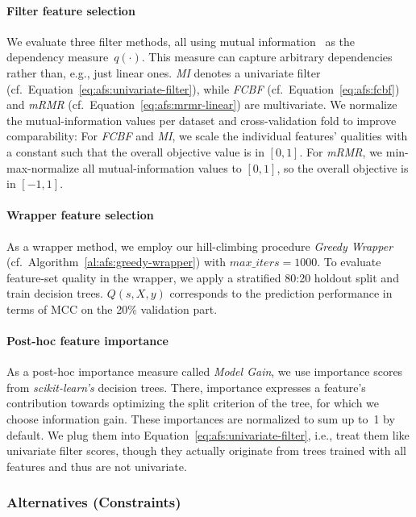 \documentclass{article}
\theoremstyle{definition}
\begin{document}
\paragraph{Filter feature selection}

We evaluate three filter methods, all using mutual information~\cite{kraskov2004estimating} as the dependency measure~$q(\cdot)$.
This measure can capture arbitrary dependencies rather than, e.g., just linear ones.
\emph{MI} denotes a univariate filter (cf.~Equation~\ref{eq:afs:univariate-filter}), while \emph{FCBF} (cf.~Equation~\ref{eq:afs:fcbf}) and \emph{mRMR} (cf.~Equation~\ref{eq:afs:mrmr-linear}) are multivariate.
We normalize the mutual-information values per dataset and cross-validation fold to improve comparability:
For \emph{FCBF} and \emph{MI}, we scale the individual features' qualities with a constant such that the overall objective value is in $[0, 1]$.
For \emph{mRMR}, we min-max-normalize all mutual-information values to $[0,1]$, so the overall objective is in $[-1,1]$.

\paragraph{Wrapper feature selection}

As a wrapper method, we employ our hill-climbing procedure \emph{Greedy Wrapper} (cf.~Algorithm~\ref{al:afs:greedy-wrapper}) with $\mathit{max\_iters} = 1000$.
To evaluate feature-set quality in the wrapper, we apply a stratified 80:20 holdout split and train decision trees.
$Q(s,X,y)$ corresponds to the prediction performance in terms of MCC on the 20\% validation part.

\paragraph{Post-hoc feature importance}

As a post-hoc importance measure called \emph{Model Gain}, we use importance scores from \emph{scikit-learn's} decision trees.
There, importance expresses a feature's contribution towards optimizing the split criterion of the tree, for which we choose information gain.
These importances are normalized to sum up to~1 by default.
We plug them into Equation~\ref{eq:afs:univariate-filter}, i.e., treat them like univariate filter scores, though they actually originate from trees trained with all features and thus are not univariate.

\subsubsection{Alternatives (Constraints)}
\label{sec:afs:experimental-design:approaches:alternatives}
\end{document}
